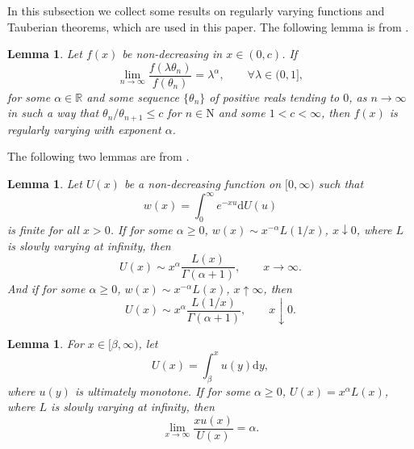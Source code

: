 \documentclass[12pt,a4paper]{amsart}
\numberwithin{equation}{section}
\theoremstyle{plain}
\newtheorem{lem}[thm]{Lemma}
\theoremstyle{definition}
\theoremstyle{remark}
\begin{document}
In this subsection we collect some results on regularly varying functions and  Tauberian theorems, which are used in this paper.
The following lemma is from \cite[Appendix 13.6]{AH}.
\begin{lem}\label{lem:regu}
Let $f(x)$ be non-decreasing in $x\in (0,c)$. If
\[
\lim_{n\to\infty}\dfrac{f(\lambda\theta_n)}{f(\theta_n)}=\lambda^\alpha,\qquad \forall \lambda\in (0,1],
\]
for some $\alpha\in\mathbb R$ and some sequence $\{\theta_n\}$ of positive reals tending to $0$, as $n\to\infty$ in such a way that $\theta_n/\theta_{n+1}\leq c$ for $n\in\mathrm N$ and some $1<c<\infty$, then $f(x)$ is regularly varying with exponent $\alpha$.
\end{lem}


The following two lemmas are from \cite[Appendix 14]{AH}.
\begin{lem}\label{lem: tau}
Let $U(x)$ be a non-decreasing function on $[0,\infty)$ such that
\[
w(x)=\int_0^\infty e^{-xu} \mathrm dU(u)
\]
is finite for all $x>0$. If for some $\alpha\geq 0$, $w(x)\sim x^{-\alpha}L(1/x)$, $x\downarrow 0$, where $L$ is slowly varying at infinity, then
\[
U(x)\sim x^{\alpha}\dfrac{L(x)}{\Gamma(\alpha+1)},\qquad x\to\infty.
\]
 And if for some $\alpha\geq 0$, $w(x)\sim x^{-\alpha}L(x)$, $x\uparrow \infty$, then
\[
U(x)\sim x^{\alpha}\dfrac{L(1/x)}{\Gamma(\alpha+1)},\qquad x\downarrow 0.
\]
\end{lem}

\begin{lem}\label{lem:tail}
	For $x\in [\beta,\infty)$, let
\[
	U(x)
	= \int_\beta^xu(y)\mathrm dy,
\]
	where $u(y)$ is ultimately monotone.  If for some $\alpha\geq 0$, $U(x)=x^\alpha L(x)$,  where $L$ is slowly varying at infinity, then
\[
	\lim_{x\to\infty}\dfrac{xu(x)}{U(x)}
	= \alpha.
\]
\end{lem}
\end{document}
